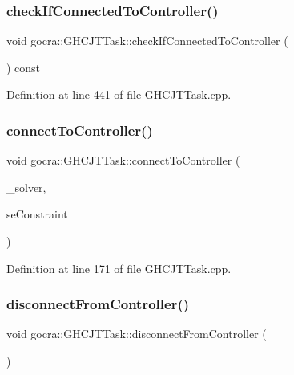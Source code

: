 \subsubsection{\texorpdfstring{check\+If\+Connected\+To\+Controller()}{checkIfConnectedToController()}}
{\footnotesize\ttfamily void gocra\+::\+G\+H\+C\+J\+T\+Task\+::check\+If\+Connected\+To\+Controller (\begin{DoxyParamCaption}{ }\end{DoxyParamCaption}) const\hspace{0.3cm}{\ttfamily [protected]}}



Definition at line 441 of file G\+H\+C\+J\+T\+Task.\+cpp.

\hypertarget{classgocra_1_1GHCJTTask_a021f21b19d0d9de1c067192166f852e6}{}\label{classgocra_1_1GHCJTTask_a021f21b19d0d9de1c067192166f852e6} 
\subsubsection{\texorpdfstring{connect\+To\+Controller()}{connectToController()}}
{\footnotesize\ttfamily void gocra\+::\+G\+H\+C\+J\+T\+Task\+::connect\+To\+Controller (\begin{DoxyParamCaption}\item[{\hyperlink{classocra_1_1OneLevelSolver}{ocra\+::\+One\+Level\+Solver} \&}]{\+\_\+solver,  }\item[{\hyperlink{classocra_1_1SumOfLinearFunctions}{Sum\+Of\+Linear\+Functions} \&}]{se\+Constraint }\end{DoxyParamCaption})\hspace{0.3cm}{\ttfamily [protected]}}



Definition at line 171 of file G\+H\+C\+J\+T\+Task.\+cpp.

\hypertarget{classgocra_1_1GHCJTTask_a5caec6472d19926a2448779fa629c9d8}{}\label{classgocra_1_1GHCJTTask_a5caec6472d19926a2448779fa629c9d8} 
\subsubsection{\texorpdfstring{disconnect\+From\+Controller()}{disconnectFromController()}}
{\footnotesize\ttfamily void gocra\+::\+G\+H\+C\+J\+T\+Task\+::disconnect\+From\+Controller (\begin{DoxyParamCaption}{ }\end{DoxyParamCaption})\hspace{0.3cm}{\ttfamily [protected]}}



